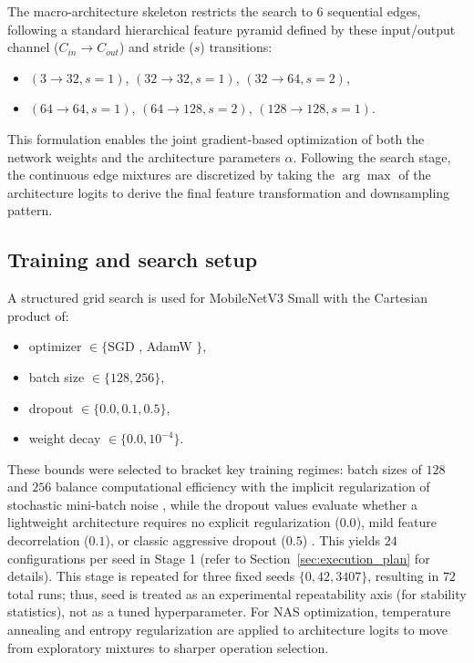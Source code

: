 \documentclass[cameraready]{Interspeech}
\begin{document}
The macro-architecture skeleton restricts the search to $6$ sequential edges, following a standard hierarchical feature pyramid defined by these input/output channel ($C_{in} \rightarrow C_{out}$) and stride ($s$) transitions:
\begin{itemize}
    \item $(3\rightarrow32, s=1)$, $(32\rightarrow32, s=1)$, $(32\rightarrow64, s=2)$,
    \item $(64\rightarrow64, s=1)$, $(64\rightarrow128, s=2)$, $(128\rightarrow128, s=1)$.
\end{itemize}
This formulation enables the joint gradient-based optimization of both the network weights and the architecture parameters $\alpha$. Following the search stage, the continuous edge mixtures are discretized by taking the $\arg\max$ of the architecture logits to derive the final feature transformation and downsampling pattern.

\subsection{Training and search setup}
A structured grid search is used for MobileNetV3 Small with the Cartesian product of:
\begin{itemize}
    \item optimizer $\in \{$SGD \cite{bottou2010large}, AdamW \cite{adamw}$\}$,
    \item batch size $\in \{128, 256\}$,
    \item dropout $\in \{0.0, 0.1, 0.5\}$,
    \item weight decay $\in \{0.0, 10^{-4}\}$.
\end{itemize}

These bounds were selected to bracket key training regimes: batch sizes of $128$ and $256$ balance computational efficiency with the implicit regularization of stochastic mini-batch noise \cite{masters2018revisiting}, while the dropout values evaluate whether a lightweight architecture requires no explicit regularization ($0.0$), mild feature decorrelation ($0.1$), or classic aggressive dropout ($0.5$) \cite{srivastava2014dropout}. This yields $24$ configurations per seed in Stage 1 (refer to Section~\ref{sec:execution_plan} for details). This stage is repeated for three fixed seeds $\{0, 42, 3407\}$, resulting in $72$ total runs; thus, seed is treated as an experimental repeatability axis (for stability statistics), not as a tuned hyperparameter. For NAS optimization, temperature annealing and entropy regularization are applied to architecture logits to move from exploratory mixtures to sharper operation selection.
\end{document}
